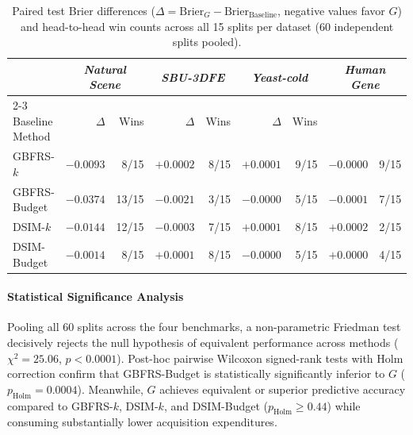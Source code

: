\begin{table}[htbp]
	\centering\small\renewcommand{\arraystretch}{1.25}\setlength{\tabcolsep}{4pt}
	\caption{Paired test Brier differences ($\Delta = \text{Brier}_G - \text{Brier}_{\text{Baseline}}$, negative values favor $G$) and head-to-head win counts across all 15 splits per dataset (60 independent splits pooled).}
	\label{tab:published-paired}
	\begin{tabular}{l rr rr rr rr}\hline
		& \multicolumn{2}{c}{\textit{Natural Scene}} & \multicolumn{2}{c}{\textit{SBU-3DFE}} & \multicolumn{2}{c}{\textit{Yeast-cold}} & \multicolumn{2}{c}{\textit{Human Gene}}\\
		\cline{2-3}\cline{4-5}\cline{6-7}\cline{8-9}
		Baseline Method & $\Delta$ & Wins & $\Delta$ & Wins & $\Delta$ & Wins\\\hline
		GBFRS-$k$ & $-0.0093$ & 8/15 & $+0.0002$ & 8/15 & $+0.0001$ & 9/15 & $-0.0000$ & 9/15\\
		GBFRS-Budget & $-0.0374$ & 13/15 & $-0.0021$ & 3/15 & $-0.0000$ & 5/15 & $-0.0001$ & 7/15\\
		DSIM-$k$ & $-0.0144$ & 12/15 & $-0.0003$ & 7/15 & $+0.0001$ & 8/15 & $+0.0002$ & 2/15\\
		DSIM-Budget & $-0.0014$ & 8/15 & $+0.0001$ & 8/15 & $-0.0000$ & 5/15 & $+0.0000$ & 4/15\\
		\hline\end{tabular}
\end{table}

\paragraph{Statistical Significance Analysis}
Pooling all 60 splits across the four benchmarks, a non-parametric Friedman test decisively rejects the null hypothesis of equivalent performance across methods ($\chi^2 = 25.06$, $p < 0.0001$). Post-hoc pairwise Wilcoxon signed-rank tests with Holm correction confirm that GBFRS-Budget is statistically significantly inferior to $G$ ($p_{\mathrm{Holm}} = 0.0004$). Meanwhile, $G$ achieves equivalent or superior predictive accuracy compared to GBFRS-$k$, DSIM-$k$, and DSIM-Budget ($p_{\mathrm{Holm}} \ge 0.44$) while consuming substantially lower acquisition expenditures.

